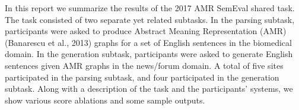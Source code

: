 In this report we summarize the results of the 2017 AMR SemEval shared task. The task consisted of two separate yet related subtasks. In the parsing subtask, participants were asked to produce Abstract Meaning Representation (AMR) (Banarescu et al., 2013) graphs for a set of English sentences in the biomedical domain. In the generation subtask, participants were asked to generate English sentences given AMR graphs in the news/forum domain. A total of five sites participated in the parsing subtask, and four participated in the generation subtask. Along with a description of the task and the participants' systems, we show various score ablations and some sample outputs.
